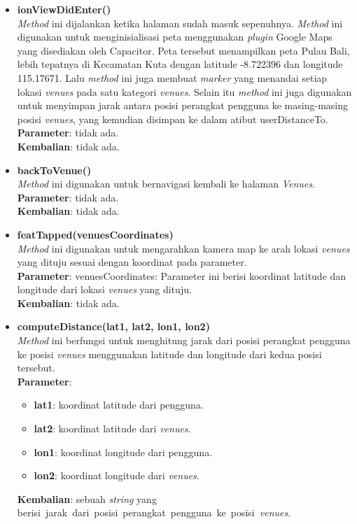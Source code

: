 \begin{enumerate}
\begin{itemize}
					\item \textbf{ionViewDidEnter()} \\
						\textit{Method} ini dijalankan ketika halaman sudah masuk sepenuhnya. \textit{Method} ini digunakan untuk menginisialisasi peta menggunakan \textit{plugin} Google Maps yang disediakan oleh Capacitor. Peta tersebut menampilkan peta Pulau Bali, lebih tepatnya di Kecamatan Kuta dengan latitude -8.722396 dan longitude 115.17671. Lalu \textit{method} ini juga membuat \textit{marker} yang menandai setiap lokasi \textit{venues} pada satu kategori \textit{venues}. Selain itu \textit{method} ini juga digunakan untuk menyimpan jarak antara posisi perangkat pengguna ke masing-masing posisi \textit{venues}, yang kemudian disimpan ke dalam atibut userDistanceTo.\\
						\textbf{Parameter}: tidak ada. \\
						\textbf{Kembalian}: tidak ada.
						
					\item \textbf{backToVenue()} \\
						\textit{Method} ini digunakan untuk bernavigasi kembali ke halaman \textit{Venues}. \\
						\textbf{Parameter}: tidak ada. \\
						\textbf{Kembalian}: tidak ada.
						
					\item \textbf{featTapped(venuesCoordinates)} \\
						\textit{Method} ini digunakan untuk mengarahkan kamera map ke arah lokasi \textit{venues} yang dituju sesuai dengan koordinat pada parameter. \\
						\textbf{Parameter}: venuesCoordinates: Parameter ini berisi koordinat latitude dan longitude dari lokasi \textit{venues} yang dituju. \\
						\textbf{Kembalian}: tidak ada.
						
					\newpage
					\item \textbf{computeDistance(lat1, lat2, lon1, lon2)} \\
						\textit{Method} ini berfungsi untuk menghitung jarak dari posisi perangkat pengguna ke posisi \textit{venues} menggunakan latitude dan longitude dari kedua posisi tersebut.\\
						\textbf{Parameter}: 
						\begin{itemize}
							\item \textbf{lat1}: koordinat latitude dari pengguna.
							\item \textbf{lat2}: koordinat latitude dari \textit{venues}.
							\item \textbf{lon1}: koordinat longitude dari pengguna.
							\item \textbf{lon2}: koordinat longitude dari \textit{venues}.
						\end{itemize}
						\textbf{Kembalian}: sebuah \textit{string} yang berisi~jarak~dari~posisi~perangkat~pengguna~ke~posisi~\textit{venues}.
				\end{itemize}
\end{enumerate}


